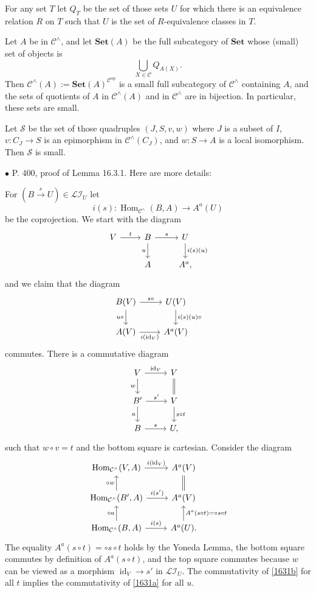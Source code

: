 \documentclass[12pt]{article}
\theoremstyle{remark}%
\newcommand{\bu}{\bullet}
\newcommand{\n}{\noindent}
\newcommand{\cc}{\mathcal}
\newcommand{\C}{\mathcal C}
\newcommand{\Set}{\textbf{Set}}
\newcommand{\mc}{\mathcal}
\newcommand{\xr}{\xrightarrow}
\newcommand{\be}{\begin{equation}}
\newcommand{\ee}{\end{equation}}
\DeclareMathOperator{\id}{id}
\DeclareMathOperator{\h}{Hom}
\DeclareMathOperator{\op}{op}
\begin{document}
For any set $T$ let $Q_T$ be the set of those sets $U$ for which there is an equivalence relation $R$ on $T$ such that $U$ is the set of $R$-equivalence classes in $T$. 

Let $A$ be in $\C^\wedge$, and let $\Set(A)$ be the full subcategory of $\Set$ whose (small) set of objects is 
$$
\bigcup_{X\in\C}Q_{A(X)}.
$$ 
Then $\C^\wedge(A):=\Set(A)^{\C^{\op}}$ is a small full subcategory of $\C^\wedge$ containing $A$, and the sets of quotients of $A$ in $\C^\wedge(A)$ and in $\C^\wedge$ are in bijection. In particular, these sets are small. 

Let $\cc S$ be the set of those quadruples $(J,S,v,w)$ where $J$ is a subset of $I$, $v:C_J\to S$ is an epimorphism in $\C^\wedge(C_J)$, and $w:S\to A$ is a local isomorphism. Then $\cc S$ is small. 


\n$\bu$ P. 400, proof of Lemma 16.3.1. Here are more details: 

For $(B\xr s U)\in\mc{LI}_U$ let 
$$
i(s):\h_{\C^\wedge}(B,A)\to A^a(U)
$$ 
be the coprojection. We start with the diagram 
$$
\begin{tikzcd}
%
V\ar{r}{t}&B\ar{d}[swap]{u}\ar{r}{s}&U\ar{d}{i(s)(u)}\\ 
{}&A&A^a,
%
\end{tikzcd}
$$ 
and we claim that the diagram 
\be\label{1631a}
\begin{tikzcd}
%
B(V)\ar{d}[swap]{u\circ}\ar{r}{s\circ}&U(V)\ar{d}{i(s)(u)\circ}\\ 
A(V)\ar{r}[swap]{i(\id_V)}&A^a(V)
%
\end{tikzcd}
\ee 
commutes. There is a commutative diagram 
$$
\begin{tikzcd}
%
V\ar{d}[swap]{w}\ar{r}{\id_V}&V\ar[equal]{d}\\ 
B'\ar{d}[swap]{a}\ar{r}{s'}&V\ar{d}{s\circ t}\\ 
B\ar{r}{s}&U,
%
\end{tikzcd}
$$ 
such that $w\circ v=t$ and the bottom square is cartesian. Consider the diagram 
%
\be\label{1631b}
\begin{tikzcd}
%
\h_{\C^\wedge}(V,A)\ar{r}{i(\id_V)}&A^a(V)\ar[equal]{d}\\ 
\h_{\C^\wedge}(B',A)\ar{u}{\circ w}\ar{r}{i(s')}&A^a(V)\\ 
\h_{\C^\wedge}(B,A)\ar{u}{\circ a}\ar{r}{i(s)}&A^a(U)\ar{u}[swap]{A^a(s\circ t)=\circ s\circ t}.
%
\end{tikzcd}
\ee
% 
The equality $A^a(s\circ t)=\circ s\circ t$ holds by the Yoneda Lemma, the bottom square commutes by definition of $A^a(s\circ t)$, and the top square commutes because $w$ can be viewed as a morphism $\id_V\to s'$ in $\mc{LI}_U$. The commutativity of \eqref{1631b} for all $t$ implies the commutativity of \eqref{1631a} for all $u$. 
\end{document}
